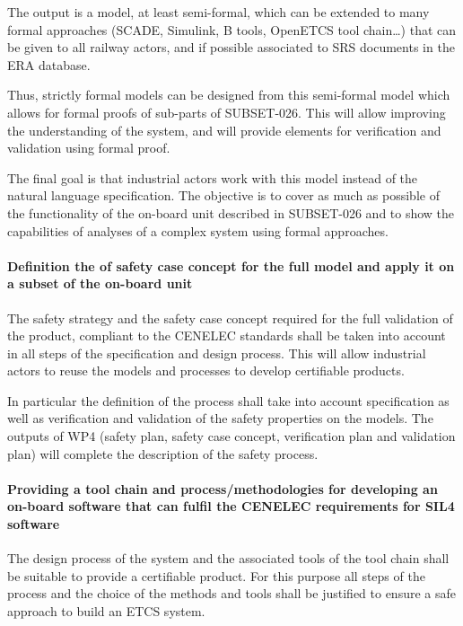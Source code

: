 The output is a model, at least semi-formal, which can be extended to many formal approaches (SCADE,
Simulink, B tools, OpenETCS tool chain…) that can be given to all railway actors, and
if possible associated to SRS documents in the ERA database.

Thus, strictly formal models can be designed from this semi-formal model which allows for formal proofs of sub-parts of SUBSET-026. This will allow improving the understanding of the system, and will provide elements for verification and validation using formal proof.

The final goal is that industrial actors work with this model instead of the
natural language specification.
The objective is to cover as much as possible of the  functionality of the on-board unit described in SUBSET-026 and to show the capabilities of analyses of a complex system using formal approaches.

\paragraph{Definition the of safety case concept for the full model and apply it on a subset of the on-board unit}
The safety strategy and the safety case concept required for the full validation of the product, compliant to the CENELEC standards shall be taken into account in all steps of the specification and design process. This will allow industrial actors to reuse the models and processes to develop certifiable products.

In particular the definition of the process shall take into account specification as well as verification and validation of the safety properties on the models. The outputs of WP4 (safety plan, safety case concept, verification plan and validation plan) will complete the description of the safety process.


\paragraph{Providing a tool chain and process/methodologies for developing
an on-board software that can fulfil the CENELEC requirements for SIL4 software}

The design process of the system and the associated tools of the tool chain shall be suitable to provide a certifiable product. For this purpose all steps of the process and the choice of the methods and tools shall be justified to ensure a safe approach to build an ETCS system.

